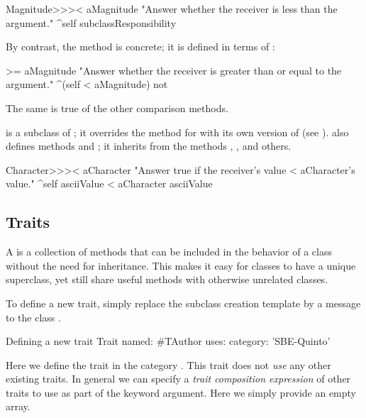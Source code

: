 \documentclass[a4paper,10pt,twoside]{book}
\begin{document}
\begin{method}[MagnitudeLessThan]{}
Magnitude>>>< aMagnitude 
	"Answer whether the receiver is less than the argument."
	^self subclassResponsibility
\end{method}

\noindent
By contrast, the method  is concrete; it is defined in terms of \ct{<}:

\begin{method}[Magnitude>=]{}
>= aMagnitude 
	"Answer whether the receiver is greater than or equal to the argument."
	^(self < aMagnitude) not
\end{method}
The same is true of the other comparison methods.

 is a subclass of ; it overrides the  method for \ct{<} with its own version of \ct{<} (see ).   also defines methods \ct{=} and ; it inherits from  the methods \ct{>=}, \ct{<=}, \ct{~=} and others.

\begin{method}[CharacterLessThan]{}
Character>>>< aCharacter 
	"Answer true if the receiver's value < aCharacter's value."
	^self asciiValue < aCharacter asciiValue
\end{method}

\subsection{Traits}
A  is a collection of methods that can be included in the behavior of a class without the need for inheritance.
This makes it easy for classes to have a unique superclass, yet still share useful methods with otherwise unrelated classes.

To define a new trait, simply replace the subclass creation template by a message to the class .

\begin{classdef}[tauthor]{Defining a new trait}
Trait named: #TAuthor
	uses: { }
	category: 'SBE-Quinto'
\end{classdef}

\noindent
Here we define the trait  in the category .
This trait does not \emph{use} any other existing traits.
In general we can specify a \emph{trait composition expression} of other traits to use as part of the  keyword argument.
Here we simply provide an empty array.
\end{document}
